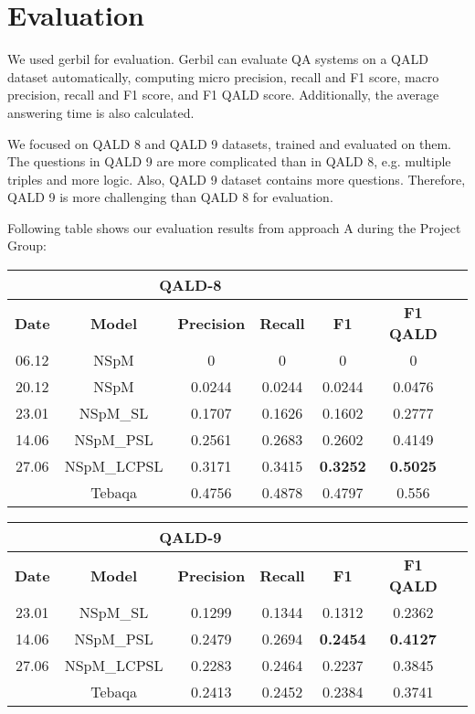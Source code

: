 
\section{Evaluation}

We used gerbil for evaluation.
Gerbil can evaluate QA systems on a QALD dataset automatically,
computing micro precision, recall and F1 score, 
macro precision, recall and F1 score,
and F1 QALD score. 
Additionally, the average answering time is also calculated. 

We focused on QALD 8 and QALD 9 datasets, trained and evaluated on them. 
The questions in QALD 9 are more complicated than in QALD 8, 
e.g. multiple triples and more logic. 
Also, QALD 9 dataset contains more questions.
Therefore, QALD 9 is more challenging than QALD 8 for evaluation. 

Following table shows our evaluation results from approach A during the Project Group:

\begin{tabular}{ccccccc} \hline
    \multicolumn{5}{c}{QALD-8} \\ \hline
    \textbf{Date} & \textbf{Model}  & \textbf{Precision} & \textbf{Recall} & \textbf{F1} & \textbf{F1 QALD} \\ \hline
    06.12       & NSpM          & 0         & 0         & 0         & 0         \\
    20.12       & NSpM          & 0.0244    & 0.0244    & 0.0244    & 0.0476    \\
    23.01       & NSpM\_SL       & 0.1707    & 0.1626    & 0.1602    & 0.2777    \\
    14.06       & NSpM\_PSL      & 0.2561    & 0.2683    & 0.2602    & 0.4149    \\
    27.06       & NSpM\_LCPSL    & 0.3171    & 0.3415    & \textbf{0.3252}    & \textbf{0.5025}    \\
    \hline
                & Tebaqa        & 0.4756     & 0.4878    & 0.4797   & 0.556   \\
    \hline
\end{tabular}

\break

\begin{tabular}{ccccccc} \hline
    \multicolumn{5}{c}{QALD-9} \\ \hline
    \textbf{Date} & \textbf{Model}  & \textbf{Precision} & \textbf{Recall} & \textbf{F1} & \textbf{F1 QALD} \\ \hline
    23.01       & NSpM\_SL       & 0.1299    & 0.1344    & 0.1312    & 0.2362    \\
    14.06       & NSpM\_PSL      & 0.2479    & 0.2694	 & \textbf{0.2454}    & \textbf{0.4127}    \\
    27.06       & NSpM\_LCPSL    & 0.2283    & 0.2464    & 0.2237    & 0.3845    \\
    \hline
                & Tebaqa        & 0.2413    & 0.2452    & 0.2384    & 0.3741  \\
    \hline
\end{tabular}


